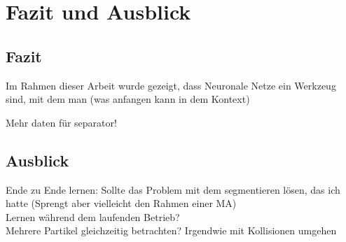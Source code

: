 \chapter{Fazit und Ausblick}


\section{Fazit}

Im Rahmen dieser Arbeit wurde gezeigt, dass Neuronale Netze ein Werkzeug sind, mit dem man (was anfangen kann in dem Kontext)


Mehr daten für separator!\\


\section{Ausblick}


Ende zu Ende lernen: Sollte das Problem mit dem segmentieren lösen, das ich hatte
(Sprengt aber vielleicht den Rahmen einer MA)\\
Lernen während dem laufenden Betrieb?\\
Mehrere Partikel gleichzeitig betrachten? Irgendwie mit Kollisionen umgehen